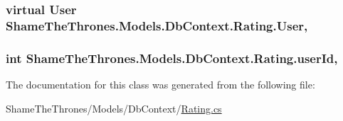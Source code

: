 \subsubsection[{\texorpdfstring{User}{User}}]{\setlength{\rightskip}{0pt plus 5cm}virtual {\bf User} Shame\+The\+Thrones.\+Models.\+Db\+Context.\+Rating.\+User\hspace{0.3cm}{\ttfamily [get]}, {\ttfamily [set]}}\hypertarget{class_shame_the_thrones_1_1_models_1_1_db_context_1_1_rating_a40758cf02663adb65bcb097bc34b5e58}{}\label{class_shame_the_thrones_1_1_models_1_1_db_context_1_1_rating_a40758cf02663adb65bcb097bc34b5e58}
\subsubsection[{\texorpdfstring{user\+Id}{userId}}]{\setlength{\rightskip}{0pt plus 5cm}int Shame\+The\+Thrones.\+Models.\+Db\+Context.\+Rating.\+user\+Id\hspace{0.3cm}{\ttfamily [get]}, {\ttfamily [set]}}\hypertarget{class_shame_the_thrones_1_1_models_1_1_db_context_1_1_rating_a714d494d3b10f60305827e75c1e2fdc4}{}\label{class_shame_the_thrones_1_1_models_1_1_db_context_1_1_rating_a714d494d3b10f60305827e75c1e2fdc4}


The documentation for this class was generated from the following file\+:\begin{DoxyCompactItemize}
\item 
Shame\+The\+Thrones/\+Models/\+Db\+Context/\hyperlink{_rating_8cs}{Rating.\+cs}\end{DoxyCompactItemize}

